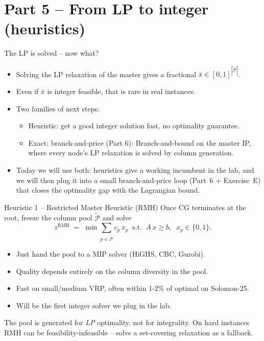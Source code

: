 \documentclass[10pt,aspectratio=169]{beamer}
\begin{document}
\section{Part 5 -- From LP to integer (heuristics)}

\begin{frame}{The LP is solved -- now what?}
  \begin{itemize}\small
    \item Solving the LP relaxation of the master gives a fractional
          $\bar x\in[0,1]^{|\widetilde{\mathcal P}|}$.
    \item Even if $\bar x$ is integer feasible, that is rare in real instances.
    \item Two families of next steps:
    \begin{itemize}\small
      \item \alert{Heuristic}: get a good integer solution fast, no
            optimality guarantee.
      \item \alert{Exact}: branch-and-price (Part 6): Branch-and-bound on the master IP, where every node's LP relaxation is solved by column generation.
    \end{itemize}
    \item Today we will use both: heuristics give a working incumbent in
          the lab, and we will then plug it into a small \alert{branch-and-price}
          loop (Part~6 + Exercise~E) that closes the optimality gap with the
          Lagrangian bound.
  \end{itemize}
\end{frame}

\begin{frame}{Heuristic 1 -- Restricted Master Heuristic (RMH)}
  Once CG terminates at the root, freeze the column pool $\widetilde{\mathcal P}$
  and solve
  \[
     z^{\text{RMH}} \;=\; \min \sum_{p\in\widetilde{\mathcal P}} c_p\, x_p
     \;\;\text{s.t.}\;\; A\, x \ge b,\;\; x_p\in\{0,1\}.
  \]
  \begin{itemize}\small
    \item Just hand the pool to a MIP solver (HiGHS, CBC, Gurobi).
    \item Quality depends entirely on the column diversity in the pool.
    \item Fast on small/medium VRP, often within 1-2\% of optimal on Solomon-25.
    \item Will be the \alert{first integer solver} we plug in the lab.
  \end{itemize}
  \vfill
  \begin{warnbox}[Caveat]
    The pool is generated for \emph{LP} optimality, not for integrality.
    On hard instances RMH can be feasibility-infeasible -- solve a
    set-covering relaxation as a fallback.
  \end{warnbox}
\end{frame}
\end{document}
